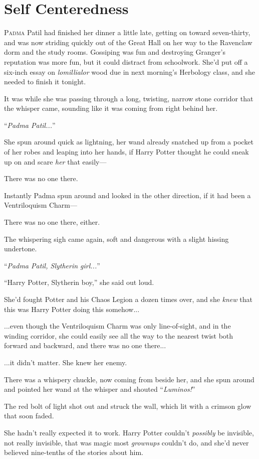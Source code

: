 \chapter{Self Centeredness}
\lettrine{P}{adma} Patil had finished her dinner a little late, getting on toward seven-thirty, and was now striding quickly out of the Great Hall on her way to the Ravenclaw dorm and the study rooms. Gossiping was fun and destroying Granger’s reputation was more fun, but it could distract from schoolwork. She’d put off a six-inch essay on \emph{lomillialor} wood due in next morning’s Herbology class, and she needed to finish it tonight.

It was while she was passing through a long, twisting, narrow stone corridor that the whisper came, sounding like it was coming from right behind her.

“\emph{Padma Patil...}”

She spun around quick as lightning, her wand already snatched up from a pocket of her robes and leaping into her hands, if Harry Potter thought he could sneak up on and scare \emph{her} that easily—

There was no one there.

Instantly Padma spun around and looked in the other direction, if it had been a Ventriloquism Charm—

There was no one there, either.

The whispering sigh came again, soft and dangerous with a slight hissing undertone.

“\emph{Padma Patil, Slytherin girl...}”

“Harry Potter, Slytherin boy,” she said out loud.

She’d fought Potter and his Chaos Legion a dozen times over, and she \emph{knew} that this was Harry Potter doing this somehow...

...even though the Ventriloquism Charm was only line-of-sight, and in the winding corridor, she could easily see all the way to the nearest twist both forward and backward, and there was no one there...

...it didn’t matter. She knew her enemy.

There was a whispery chuckle, now coming from beside her, and she spun around and pointed her wand at the whisper and shouted “\emph{Luminos!}”

The red bolt of light shot out and struck the wall, which lit with a crimson glow that soon faded.

She hadn’t really expected it to work. Harry Potter couldn’t \emph{possibly} be invisible, not really invisible, that was magic most \emph{grownups} couldn’t do, and she’d never believed nine-tenths of the stories about him.

